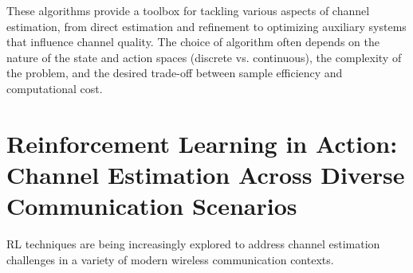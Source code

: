 \documentclass[journal,twocolumn]{IEEEtran}
\begin{document}
These algorithms provide a toolbox for tackling various aspects of channel estimation, from direct estimation and refinement to optimizing auxiliary systems that influence channel quality. The choice of algorithm often depends on the nature of the state and action spaces (discrete vs. continuous), the complexity of the problem, and the desired trade-off between sample efficiency and computational cost.



\section{Reinforcement Learning in Action: Channel Estimation Across Diverse Communication Scenarios}
RL techniques are being increasingly explored to address channel estimation challenges in a variety of modern wireless communication contexts.
\end{document}
